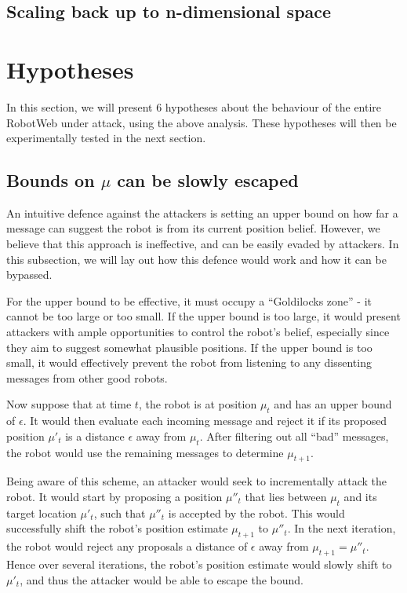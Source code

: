 \subsection{Scaling back up to n-dimensional space}

\section{Hypotheses}
In this section, we will present 6 hypotheses about the behaviour of the entire RobotWeb under attack, using the above analysis. These hypotheses will then be experimentally tested in the next section.

\subsection{Bounds on $\mu$ can be slowly escaped} \label{hyp:1}
An intuitive defence against the attackers is setting an upper bound on how far a message can suggest the robot is from its current position belief. 
However, we believe that this approach is ineffective, and can be easily evaded by attackers. In this subsection, we will lay out how this defence would work and how it can be bypassed.

For the upper bound to be effective, it must occupy a ``Goldilocks zone'' - it cannot be too large or too small. If the upper bound is too large, it would present attackers with ample opportunities to control the robot's belief, especially since they aim to suggest somewhat plausible positions.
If the upper bound is too small, it would effectively prevent the robot from listening to any dissenting messages from other good robots.

Now suppose that at time $t$, the robot is at position $\mu_t$ and has an upper bound of $\epsilon$. It would then evaluate each incoming message and reject it if its proposed position $\mu'_t$ is a distance $\epsilon$ away from $\mu_t$. After filtering out all ``bad'' messages, the robot would use the remaining messages to determine $\mu_{t+1}$. 

Being aware of this scheme, an attacker would seek to incrementally attack the robot. It would start by proposing a position $\mu''_t$ that lies between $\mu_t$ and its target location $\mu'_t$, such that $\mu''_t$ is accepted by the robot. This would successfully shift the robot's position estimate $\mu_{t+1}$ to $\mu''_t$. In the next iteration, the robot would reject any proposals a distance of $\epsilon$ away from $\mu_{t+1} = \mu''_t$. Hence over several iterations, the robot's position estimate would slowly shift to $\mu'_t$, and thus the attacker would be able to escape the bound.

